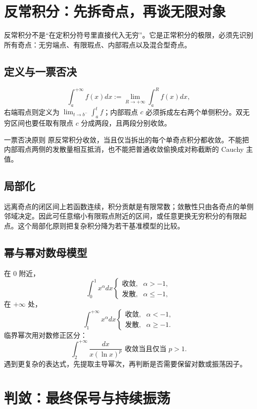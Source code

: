 \documentclass[11pt,a4paper,fontset=fandol]{ctexart}
\begin{document}
\section{反常积分：先拆奇点，再谈无限对象}

反常积分不是“在定积分符号里直接代入无穷”。它是正常积分的极限，必须先识别所有奇点：无穷端点、有限瑕点、内部瑕点以及混合型奇点。

\subsection{定义与一票否决}

\[
\int_a^{+\infty}{f(x)}dx:=\lim_{R\to+\infty}\int_a^R{f(x)}dx,
\]
右端瑕点则定义为 $\lim_{t\to b^-}\int_a^t{f}$；内部瑕点 $c$ 必须拆成左右两个单侧积分。双无穷区间也要任取有限点 $c$ 分成两段，且两段分别收敛。

\begin{warnbox}{一票否决原则}
原反常积分收敛，当且仅当拆出的每个单奇点积分都收敛。不能把内部瑕点两侧的发散量相互抵消，也不能把普通收敛偷换成对称截断的 Cauchy 主值。
\end{warnbox}

\subsection{局部化}

远离奇点的闭区间上若函数连续，积分贡献是有限常数；敛散性只由各奇点的单侧邻域决定。因此可任意缩小有限瑕点附近的区间，或任意更换无穷积分的有限起点。这个局部化原则把复杂积分降为若干基准模型的比较。

\subsection{幂与幂对数母模型}

在 $0$ 附近，
\[
\int_0^1x^\alpha dx
\begin{cases}\text{收敛},&\alpha>-1,\\\text{发散},&\alpha\le-1,\end{cases}
\]
在 $+\infty$ 处，
\[
\int_1^{+\infty}x^\alpha dx
\begin{cases}\text{收敛},&\alpha<-1,\\\text{发散},&\alpha\ge-1.\end{cases}
\]
临界幂次用对数修正区分：
\[
\int_2^{+\infty}\frac{dx}{x{(\ln x)}^p}
\text{ 收敛当且仅当 }p>1.
\]
遇到更复杂的表达式，先提取主导幂次，再判断是否需要保留对数或振荡因子。

\section{判敛：最终保号与持续振荡}
\end{document}
